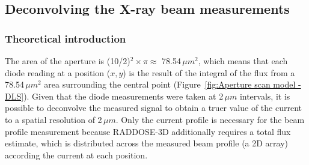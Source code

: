 \subsection{Deconvolving the X-ray beam measurements}
\label{sub:Deconvolving the X-ray beam measurements}

\subsubsection{Theoretical introduction}
\label{subs:Theoretical introduction}
The area of the aperture is (10/2)$^2 \times \pi \approx$ 78.54$\,\mu m^2$, which means that each diode reading at a position ($x, y$) is the result of the integral of the flux from a 78.54$\,\mu m^2$ area surrounding the central point (Figure~\ref{fig:Aperture scan model - DLS}).
Given that the diode measurements were taken at 2$\,\mu m$ intervals, it is possible to deconvolve the measured signal to obtain a truer value of the current to a spatial resolution of 2$\,\mu m$.
Only the current profile is necessary for the beam profile measurement because RADDOSE-3D additionally requires a total flux estimate, which is distributed across the measured beam profile (a 2D array) according the current at each position.
